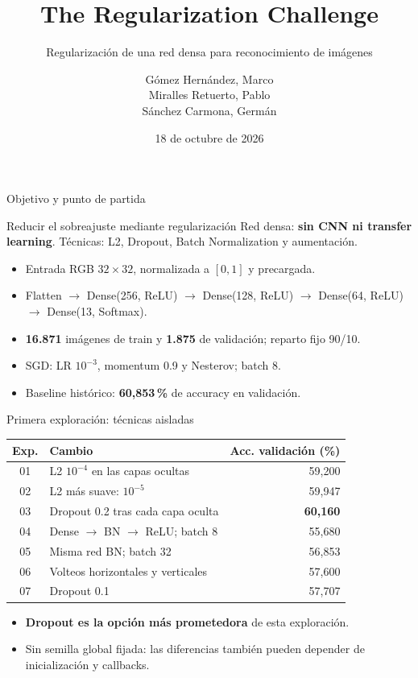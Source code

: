 \documentclass{beamer}
\title{The Regularization Challenge}
\subtitle{Regularización de una red densa para reconocimiento de imágenes}
\author[Gómez, Miralles y Sánchez]{Gómez Hernández, Marco \\
Miralles Retuerto, Pablo \\ Sánchez Carmona, Germán}
\institute[UPM]{Universidad Politécnica de Madrid\\
Máster Universitario en Inteligencia Artificial\\Visión por Computador}
\date{18 de octubre de 2026}
\begin{document}
\begin{frame}\titlepage\end{frame}

\begin{frame}{Objetivo y punto de partida}
\small
\begin{block}{Reducir el sobreajuste mediante regularización}
Red densa: \textbf{sin CNN ni transfer learning}. Técnicas: L2, Dropout, Batch Normalization y aumentación.
\end{block}
\begin{itemize}
\item Entrada RGB $32\times32$, normalizada a $[0,1]$ y precargada.
\item Flatten $\to$ Dense(256, ReLU) $\to$ Dense(128, ReLU) $\to$ Dense(64, ReLU) $\to$ Dense(13, Softmax).
\item \textbf{16.871} imágenes de train y \textbf{1.875} de validación; reparto fijo 90/10.
\item SGD: LR $10^{-3}$, momentum 0.9 y Nesterov; batch 8.
\item Baseline histórico: \textbf{60,853\,\%} de accuracy en validación.
\end{itemize}
\end{frame}

\begin{frame}{Primera exploración: técnicas aisladas}
\small
\setlength{\tabcolsep}{4pt}\renewcommand{\arraystretch}{1.3}
{\centering
\begin{tabularx}{\textwidth}{@{}c X r@{}}
\toprule
\textbf{Exp.} & \textbf{Cambio} & \textbf{Acc. validación (\%)} \\
\midrule
01 & L2 $10^{-4}$ en las capas ocultas & 59,200 \\
02 & L2 más suave: $10^{-5}$ & 59,947 \\
03 & Dropout 0.2 tras cada capa oculta & \textbf{60,160} \\
04 & Dense $\to$ BN $\to$ ReLU; batch 8 & 55,680 \\
05 & Misma red BN; batch 32 & 56,853 \\
06 & Volteos horizontales y verticales & 57,600 \\
07 & Dropout 0.1 & 57,707 \\
\bottomrule
\end{tabularx}
\par}
\medskip
\begin{itemize}
\item \textbf{Dropout es la opción más prometedora} de esta exploración.
\item Sin semilla global fijada: las diferencias también pueden depender de inicialización y callbacks.
\end{itemize}
\end{frame}
\end{document}
